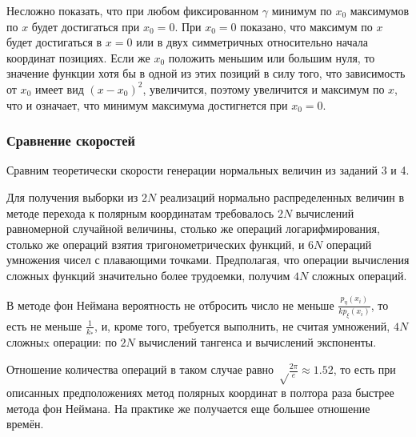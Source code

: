 \documentclass[12pt, a4paper]{article}
\begin{document}
Несложно показать, что при любом фиксированном $\gamma$ минимум по $x_0$ максимумов по $x$ будет достигаться при $x_0 = 0$. При $x_0 = 0$ показано, что максимум по $x$ будет достигаться в $x = 0$ или в двух симметричных относительно начала координат позициях. Если же $x_0$ положить меньшим или большим нуля, то значение функции хотя бы в одной из этих позиций в силу того, что зависимость от $x_0$ имеет вид $\left(x-x_0\right)^2$, увеличится, поэтому увеличится и максимум по $x$, что и означает, что минимум максимума достигнется при $x_0 = 0$.

\subsubsection{Сравнение скоростей}
Сравним теоретически скорости генерации нормальных величин из заданий 3 и 4.

Для получения выборки из $2N$ реализаций нормально распределенных величин в методе перехода к полярным координатам требовалось $2N$ вычислений равномерной случайной величины, столько же операций логарифмирования, столько же операций взятия тригонометрических функций, и $6N$ операций умножения чисел с плавающими точками. Предполагая, что операции вычисления сложных функций значительно более трудоемки, получим $4N$ сложных операций.

В методе фон Неймана вероятность не отбросить число не меньше $\frac{p_\eta(x_i)}{k p_\xi(x_i)}$, то есть не меньше $\frac{1}{k_*}$, и, кроме того, требуется выполнить, не считая умножений, $4N$ сложныx операции: по $2N$ вычислений тангенса и вычислений экспоненты.

Отношение количества операций в таком случае равно $\sqrt\frac{2\pi}e \approx 1.52$, то есть при описанных предположениях метод полярных координат в полтора раза быстрее метода фон Неймана. На практике же получается еще большее отношение времён.

\newpage
\end{document}
